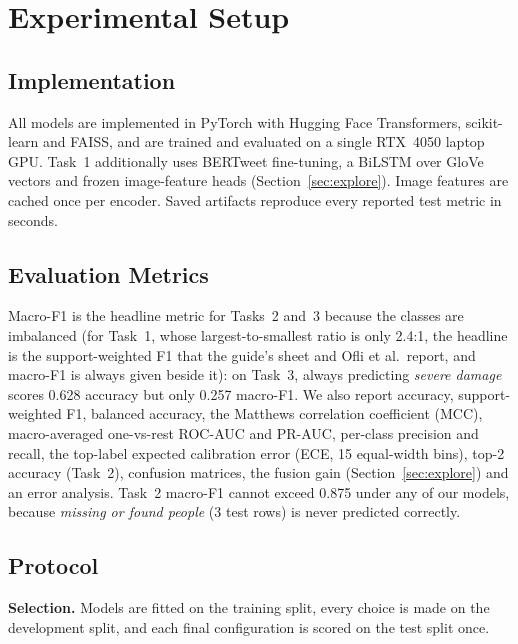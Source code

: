 \documentclass[conference]{IEEEtran}
\begin{document}
\section{Experimental Setup}

\subsection{Implementation}
All models are implemented in PyTorch with Hugging Face Transformers, scikit-learn and FAISS, and are trained and evaluated on a single RTX~4050 laptop GPU. Task~1 additionally uses BERTweet fine-tuning, a BiLSTM over GloVe vectors and frozen image-feature heads (Section~\ref{sec:explore}). Image features are cached once per encoder. Saved artifacts reproduce every reported test metric in seconds.

\subsection{Evaluation Metrics}
Macro-F1 is the headline metric for Tasks~2 and~3 because the classes are imbalanced (for Task~1, whose largest-to-smallest ratio is only 2.4:1, the headline is the support-weighted F1 that the guide's sheet and Ofli et al.\ report, and macro-F1 is always given beside it): on Task~3, always predicting \emph{severe damage} scores 0.628 accuracy but only 0.257 macro-F1. We also report accuracy, support-weighted F1, balanced accuracy, the Matthews correlation coefficient (MCC), macro-averaged one-vs-rest ROC-AUC and PR-AUC, per-class precision and recall, the top-label expected calibration error (ECE, 15 equal-width bins), top-2 accuracy (Task~2), confusion matrices, the fusion gain (Section~\ref{sec:explore}) and an error analysis. Task~2 macro-F1 cannot exceed 0.875 under any of our models, because \emph{missing or found people} (3 test rows) is never predicted correctly.

\subsection{Protocol}
\label{sec:protocol}
\textbf{Selection.} Models are fitted on the training split, every choice is made on the development split, and each final configuration is scored on the test split once.
\end{document}
